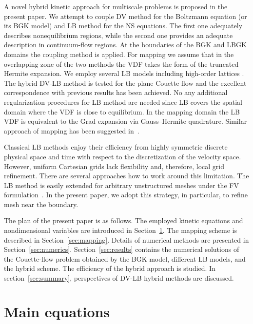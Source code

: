 \documentclass[]{elsarticle} %
\begin{document}
{%
A novel hybrid kinetic approach for multiscale problems is proposed in the present paper.
We attempt to couple DV method for the Boltzmann equation (or its BGK model) and LB method for the NS equations.
The first one adequately describes nonequilibrium regions, while the second one provides an adequate description in continuum-flow regions.
At the boundaries of the BGK and LBGK domains the coupling method is applied.
For mapping we assume that in the overlapping zone of the two methods the VDF takes the form of the truncated Hermite expansion.
We employ several LB models including high-order lattices \cite{Shan2006, Feuchter2016}.
The hybrid DV-LB method is tested for the plane Couette flow and the excellent correspondence with previous results has been achieved.
No any additional regularization procedures \cite{Latt2006, Mont2015} for LB method are needed
since LB covers the spatial domain where the VDF is close to equilibrium.
In the mapping domain the LB VDF is equivalent to the Grad expansion via Gauss--Hermite quadrature.
Similar approach of mapping has been suggested in~\cite{Staso2016short, Staso2016long, Staso2018}.

Classical LB methods enjoy their efficiency from highly symmetric discrete physical space and time
with respect to the discretization of the velocity space.
However, uniform Cartesian grids lack flexibility and, therefore, local grid refinement.
There are several approaches how to work around this limitation.
The LB method is easily extended for arbitrary unstructured meshes
under the FV formulation~\cite{Succi1992, Peng1999, Patil2009, Li2016}.
In the present paper, we adopt this strategy, in particular, to refine mesh near the boundary.

The plan of the present paper is as follows.
The employed kinetic equations and nondimensional variables are introduced in Section~\ref{sec:equations}.
The mapping scheme is described in Section~\ref{sec:mapping}.
Details of numerical methods are presented in Section~\ref{sec:numerics}.
Section~\ref{sec:results} contains the numerical solutions of the Couette-flow problem
obtained by the BGK model, different LB models, and the hybrid scheme.
The efficiency of the hybrid approach is studied.
In section~\ref{sec:summary}, perspectives of DV-LB hybrid methods are discussed.

\section{Main equations}\label{sec:equations}

}
\end{document}
